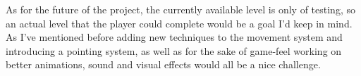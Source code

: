 As for the future of the project, the currently available level is only of testing, so an actual level that the player could complete would be a goal I'd keep in mind. As I've mentioned before adding new techniques to the movement system and introducing a pointing system, as well as for the sake of game-feel working on better animations, sound and visual effects would all be a nice challenge.